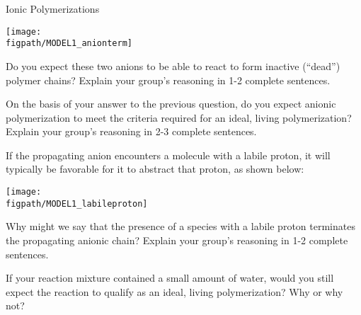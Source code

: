 \begin{activity}{Ionic Polymerizations}
\begin{ctqs}
	\centerline{\texttt{[image: \\figpath/MODEL1\_anionterm]}}
	
		Do you expect these two anions to be able to react to form inactive (``dead'') polymer chains?  Explain your group's reasoning in 1-2 complete sentences.
	
		\begin{solution}[1.25in]
		\end{solution}
	
	\question On the basis of your answer to the previous question, do you expect anionic polymerization to meet the criteria required for an ideal, living polymerization?  Explain your group's reasoning in 2-3 complete sentences.
	
		\begin{solution}[1.25in]
		\end{solution}

\end{ctqs}

\begin{infobox}

	If the propagating anion encounters a molecule with a labile proton, it will typically be favorable for it to abstract that proton, as shown below:
	
	\centerline{\texttt{[image: \\figpath/MODEL1\_labileproton]}}
	
\end{infobox}

\begin{ctqs}
	
	
	\question Why might we say that the presence of a species with a labile proton terminates the propagating anionic chain?  Explain your group's reasoning in 1-2 complete sentences.
	
		\begin{solution}[1.25in]
		\end{solution}
	
	\question If your reaction mixture contained a small amount of water, would you still expect the reaction to qualify as an ideal, living polymerization?  Why or why not?
	
		\begin{solution}[1.25in]
		\end{solution}
	

\end{ctqs}
\end{activity}
